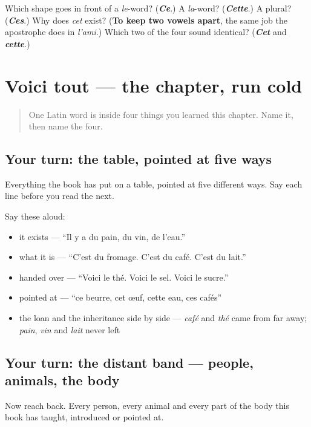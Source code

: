 \begin{tcolorbox}[breakable,colback=teal!4,colframe=teal!35!black,title={Before you move on}]
Which shape goes in front of a \emph{le}-word? (\emph{\textbf{Ce}}.) A \emph{la}-word? (\emph{\textbf{Cette}}.) A plural? (\emph{\textbf{Ces}}.) Why does \emph{cet} exist? (\textbf{To keep two vowels apart}, the same job the apostrophe does in \emph{l'ami}.) Which two of the four sound identical? (\emph{\textbf{Cet}} and \emph{\textbf{cette}}.)
\end{tcolorbox}
\section[Practice]{Voici tout — the chapter, run cold}

\label{lesson:FR-R34-voici-tout}



\begin{quote}
One Latin word is inside four things you learned this chapter. Name it, then name the four.
\end{quote}

\subsection*{Your turn: the table, pointed at five ways}
Everything the book has put on a table, pointed at five different ways. Say each line before you read the next.

Say these aloud:

\begin{itemize}
\raggedright
  \item it exists — \textquotedblleft{}Il y a du pain, du vin, de l'eau.\textquotedblright{}
  \item what it is — \textquotedblleft{}C'est du fromage. C'est du café. C'est du lait.\textquotedblright{}
  \item handed over — \textquotedblleft{}Voici le thé. Voici le sel. Voici le sucre.\textquotedblright{}
  \item pointed at — \textquotedblleft{}ce beurre, cet œuf, cette eau, ces cafés\textquotedblright{}
  \item the loan and the inheritance side by side — \emph{café} and \emph{thé} came from far away; \emph{pain}, \emph{vin} and \emph{lait} never left
\end{itemize}

\subsection*{Your turn: the distant band — people, animals, the body}
Now reach back. Every person, every animal and every part of the body this book has taught, introduced or pointed at.

